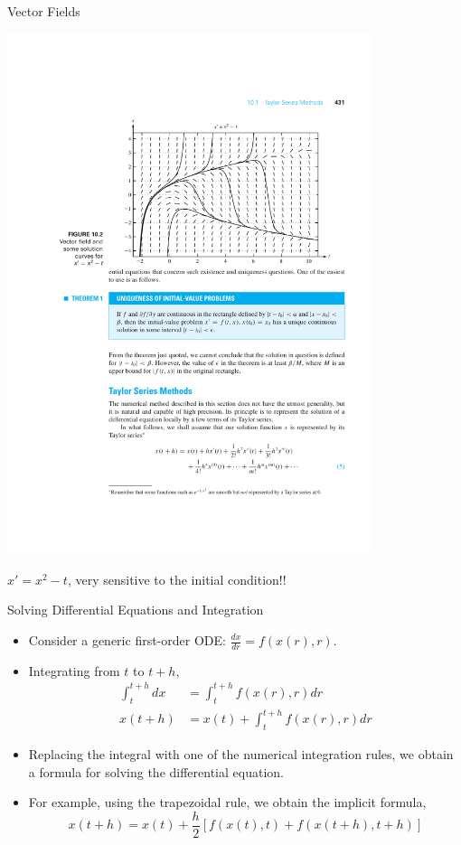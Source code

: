 \documentclass{beamer}
\newcommand{\beforeverb}{\scriptsize}
\newcommand{\afterverb}{\normalsize}
\begin{document}
\begin{frame}{Vector Fields}
\centerline{\includegraphics[width=0.8\textwidth]{Lec13_fig2}}
\begin{center}
$x'=x^2-t$, very sensitive to the initial condition!!
\end{center}
\end{frame}

\begin{frame}{Solving Differential Equations and Integration}
\begin{itemize}
\item Consider a generic first-order ODE:
$\frac{dx}{dr}=f(x(r),r)$. 
\item Integrating from $t$ to $t+h$, 
\beforeverb
\begin{align*}
\int_t^{t+h} dx&=\int_t^{t+h} f(x(r),r) dr\\
x(t+h)&=x(t)+\int_t^{t+h} f(x(r),r) dr
\end{align*}
\afterverb

\item Replacing the integral with one of the numerical integration rules, we obtain a formula for solving the differential equation.
\item For example, using the trapezoidal rule, we obtain the \alert{implicit formula},
\beforeverb
\[
x(t+h)=x(t)+\frac{h}{2}\left[f(x(t),t)+f(x(t+h), t+h)\right]
\]
\afterverb
\end{itemize}
\end{frame}
\end{document}
